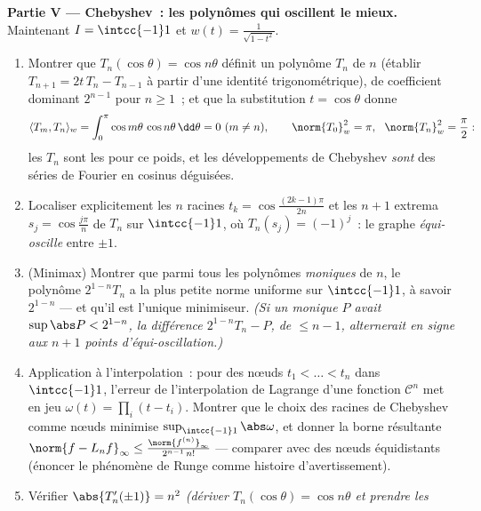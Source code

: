 \begin{problem}
\medskip
\noindent\textbf{Partie V --- Chebyshev~: les polynômes qui
oscillent le mieux.} Maintenant $I = \intcc{-1}1$ et $w(t) =
\frac1{\sqrt{1 - t^2}}$.
\begin{enumerate}[resume]
  \item Montrer que $T_n(\cos\theta) = \cos n\theta$ définit
        un polynôme $T_n$ de  $n$ (établir $T_{n+1} =
        2t\,T_n - T_{n-1}$ à partir d'une identité
        trigonométrique), de coefficient dominant $2^{n-1}$
        pour $n \geq 1$~; et que la substitution $t =
        \cos\theta$ donne
        \[
        \langle T_m, T_n\rangle_w =
        \int_0^\pi\cos m\theta\,\cos n\theta\,\dd\theta
        = 0 \ (m \neq n), \qquad
        \norm{T_0}_w^2 = \pi,\ \ \norm{T_n}_w^2 = \frac\pi2 :
        \]
        les $T_n$ sont les  pour ce
        poids, et les développements de Chebyshev \emph{sont}
        des séries de Fourier en cosinus déguisées.
  \item Localiser explicitement les $n$ racines $t_k =
        \cos\frac{(2k-1)\pi}{2n}$ et les $n + 1$ extrema $s_j
        = \cos\frac{j\pi}n$ de $T_n$ sur $\intcc{-1}1$, où
        $T_n(s_j) = (-1)^j$~: le graphe \emph{équi-oscille}
        entre $\pm1$.
  \item (Minimax) Montrer que parmi tous les polynômes
        \emph{moniques} de  $n$, le polynôme
        $2^{1-n}T_n$ a la plus petite norme uniforme sur
        $\intcc{-1}1$, à savoir $2^{1-n}$ --- et qu'il est
        l'unique minimiseur. \emph{(Si un monique $P$ avait
        $\sup\abs P < 2^{1-n}$, la différence $2^{1-n}T_n -
        P$, de  $\leq n-1$, alternerait en signe aux $n+1$
        points d'équi-oscillation.)}
  \item Application à l'interpolation~: pour des nœuds $t_1
        < \dots < t_n$ dans $\intcc{-1}1$, l'erreur de
        l'interpolation de Lagrange d'une fonction $\mathcal
        C^n$ met en jeu $\omega(t) = \prod_i(t - t_i)$.
        Montrer que le choix des racines de Chebyshev comme
        nœuds minimise $\sup_{\intcc{-1}1}\abs\omega$, et
        donner la borne résultante $\norm{f - L_nf}_\infty
        \leq \frac{\norm{f^{(n)}}_\infty}{2^{n-1}\,n!}$ ---
        comparer avec des nœuds équidistants (énoncer le
        phénomène de Runge comme histoire d'avertissement).
  \item Vérifier $\abs{T_n'(\pm1)} = n^2$ \emph{(dériver
        $T_n(\cos\theta) = \cos n\theta$ et prendre les
}
\end{enumerate}
\end{problem}

